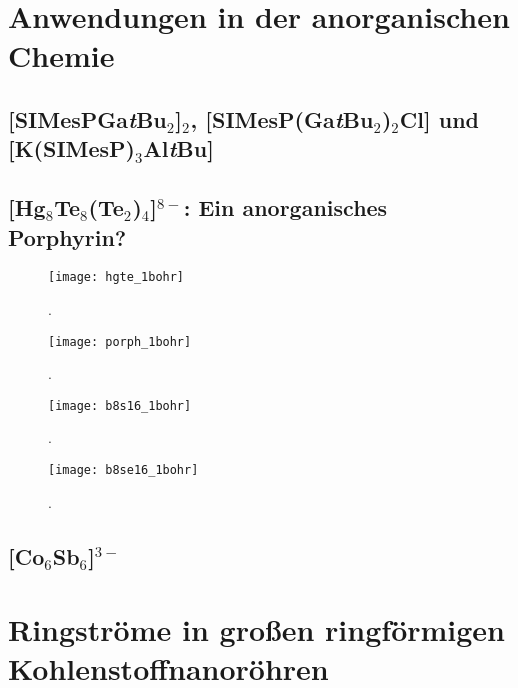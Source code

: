 \section{Anwendungen in der anorganischen Chemie}
\subsection{[SIMesPGa\textit{t}Bu$_2$]$_2$, [SIMesP(Ga\textit{t}Bu$_2$)$_2$Cl] und [K(SIMesP)$_3$Al\textit{t}Bu]}
\subsection{[Hg$_8$Te$_8$(Te$_2$)$_4$]$^{8-}$: Ein anorganisches Porphyrin?}
\begin{figure}[ht!]
	\centering
	\texttt{[image: hgte\_1bohr]}
	\captionsetup{figurewithin = chapter}
	\captionsetup{font=small, labelfont=bf}\caption[]{.}
\label{abb:hgtelic}
\end{figure}

\begin{figure}[ht!]
	\centering
	\texttt{[image: porph\_1bohr]}
	\captionsetup{figurewithin = chapter}
	\captionsetup{font=small, labelfont=bf}\caption[]{.}
\label{abb:porphlic}
\end{figure}

\begin{figure}[ht!]
	\centering
	\texttt{[image: b8s16\_1bohr]}
	\captionsetup{figurewithin = chapter}
	\captionsetup{font=small, labelfont=bf}\caption[]{.}
\label{abb:b8s16hlic}
\end{figure}

\begin{figure}[ht!]
	\centering
	\texttt{[image: b8se16\_1bohr]}
	\captionsetup{figurewithin = chapter}
	\captionsetup{font=small, labelfont=bf}\caption[]{.}
\label{abb:b8se16hlic}
\end{figure}
\subsection{[Co\@Sn$_6$Sb$_6$]$^{3-}$}
\section{Ringströme in großen ringförmigen Kohlenstoffnanoröhren}